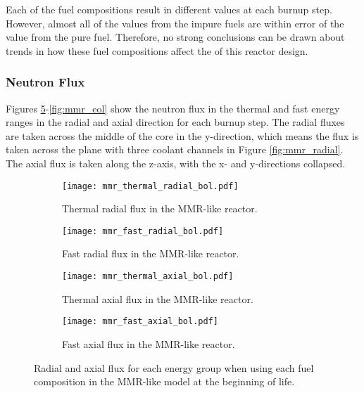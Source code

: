 Each of the fuel compositions result in different \betaEff values at 
each burnup step. However, almost all of the values from the impure 
fuels are within error of the value from the pure fuel. Therefore, no 
strong conclusions can be drawn about trends in how these fuel compositions 
affect the \betaEff of this reactor design. 

\subsubsection{Neutron Flux}

Figures \ref{fig:mmr_bol}-\ref{fig:mmr_eol} show the neutron flux 
in the thermal and fast energy ranges in the radial and axial 
direction for each burnup step. The radial fluxes are taken 
across the middle of the core in the y-direction, which means the flux 
is taken across the plane with three coolant channels in Figure 
\ref{fig:mmr_radial}. The axial flux is taken along the z-axis, with the 
x- and y-directions collapsed. 

\begin{figure}
        \centering
        \begin{subfigure}[b]{0.48\textwidth}
            \centering
            \texttt{[image: mmr\_thermal\_radial\_bol.pdf]}
            \caption{Thermal radial flux in the \gls{MMR}-like reactor.}
            \label{fig:mmr_thermal_radial_bol}
        \end{subfigure}
        \hfill
        \begin{subfigure}[b]{0.48\textwidth}
            \centering
            \texttt{[image: mmr\_fast\_radial\_bol.pdf]}
            \caption{Fast radial flux in the \gls{MMR}-like reactor.}
            \label{fig:mmr_fast_radial_bol}
        \end{subfigure}
        \hfill            
        \begin{subfigure}[b]{0.48\textwidth}
            \centering
            \texttt{[image: mmr\_thermal\_axial\_bol.pdf]}
            \caption{Thermal axial flux in the \gls{MMR}-like reactor. }
            \label{fig:mmr_thermal_axial_bol}
        \end{subfigure}
        \hfill
        \begin{subfigure}[b]{0.48\textwidth}
            \centering
            \texttt{[image: mmr\_fast\_axial\_bol.pdf]}
            \caption{Fast axial flux in the \gls{MMR}-like reactor.}
            \label{fig:mmr_fast_axial_bol}
        \end{subfigure}
        \hfill
        \caption{Radial and axial flux for each energy group when using 
        each fuel composition in the \gls{MMR}-like model at the beginning 
        of life.}
        \label{fig:mmr_bol}
   \end{figure}


